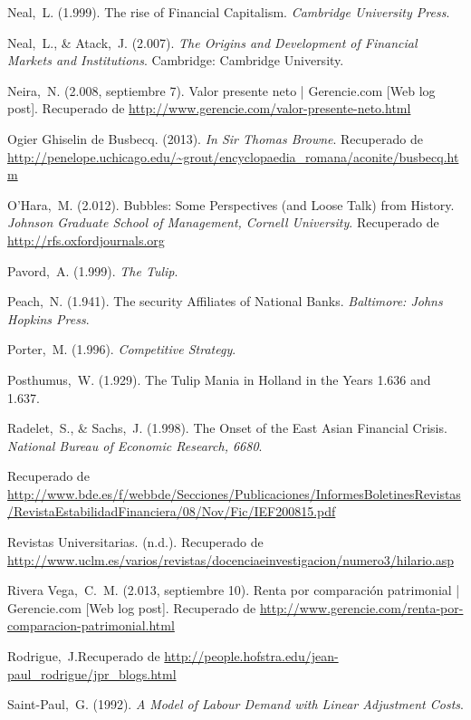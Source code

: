 \begin{thebibliography}{11}
	\bibitem{}
		Neal, L. (1.999). The rise of Financial Capitalism. \emph{Cambridge University Press}.

	\bibitem{}
		Neal, L., \& Atack, J. (2.007). \emph{The Origins and Development of Financial Markets and Institutions}. Cambridge: Cambridge University. 	 

	\bibitem{}
		Neira, N. (2.008, septiembre 7). Valor presente neto | Gerencie.com [Web log post]. Recuperado de \url{http://www.gerencie.com/valor-presente-neto.html}
	

	\bibitem{}
		Ogier Ghiselin de Busbecq. (2013). \emph{In Sir Thomas Browne}. Recuperado de \url{http://penelope.uchicago.edu/~grout/encyclopaedia\_romana/aconite/busbecq.htm}

	\bibitem{}
		O’Hara, M. (2.012). Bubbles: Some Perspectives (and Loose Talk) from History. \emph{Johnson Graduate School of Management, Cornell University}. Recuperado de \url{http://rfs.oxfordjournals.org}

	\bibitem{}
		Pavord, A. (1.999). \emph{The Tulip}. 	

	\bibitem{}
		Peach, N. (1.941). The security Affiliates of National Banks. \emph{Baltimore: Johns Hopkins Press}.

	\bibitem{}
		Porter, M. (1.996). \emph{Competitive Strategy}. 

	\bibitem{}
		Posthumus, W. (1.929). The Tulip Mania in Holland in the Years 1.636 and 1.637. 	

	\bibitem{}
		Radelet, S., \& Sachs, J. (1.998). The Onset of the East Asian Financial Crisis. \emph{National Bureau of Economic Research, 6680}. 

	\bibitem{}
		Recuperado de \url{http://www.bde.es/f/webbde/Secciones/Publicaciones/InformesBoletinesRevistas/RevistaEstabilidadFinanciera/08/Nov/Fic/IEF200815.pdf}

	\bibitem{}
		Revistas Universitarias. (n.d.). Recuperado de \url{http://www.uclm.es/varios/revistas/docenciaeinvestigacion/numero3/hilario.asp}

	\bibitem{}
		Rivera Vega, C. M. (2.013, septiembre 10). Renta por comparación patrimonial | Gerencie.com [Web log post]. Recuperado de \url{http://www.gerencie.com/renta-por-comparacion-patrimonial.html}

	\bibitem{}
		Rodrigue, J.Recuperado de \url{http://people.hofstra.edu/jean-paul\_rodrigue/jpr\_blogs.html}

	\bibitem{}
		Saint-Paul, G. (1992). \emph{A Model of Labour Demand with Linear Adjustment Costs}.  


\end{thebibliography}
